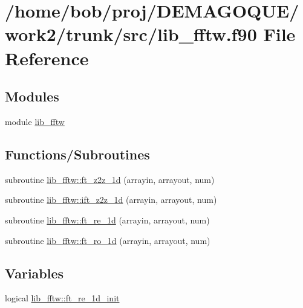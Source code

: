\hypertarget{lib__fftw_8f90}{
\section{/home/bob/proj/DEMAGOQUE/work2/trunk/src/lib\_\-fftw.f90 File Reference}
\label{lib__fftw_8f90}
}
\subsection*{Modules}
\begin{DoxyCompactItemize}
\item 
module \hyperlink{namespacelib__fftw}{lib\_\-fftw}
\end{DoxyCompactItemize}
\subsection*{Functions/Subroutines}
\begin{DoxyCompactItemize}
\item 
subroutine \hyperlink{namespacelib__fftw_aa8927337a6ab7389c514e6460179570c}{lib\_\-fftw::ft\_\-z2z\_\-1d} (arrayin, arrayout, num)
\item 
subroutine \hyperlink{namespacelib__fftw_a29b8b749b6fc05610271170ebcce73b0}{lib\_\-fftw::ift\_\-z2z\_\-1d} (arrayin, arrayout, num)
\item 
subroutine \hyperlink{namespacelib__fftw_a2149f71532d3cff627c4683eb96553dc}{lib\_\-fftw::ft\_\-re\_\-1d} (arrayin, arrayout, num)
\item 
subroutine \hyperlink{namespacelib__fftw_a65faa306b75bb0444df109807bad2046}{lib\_\-fftw::ft\_\-ro\_\-1d} (arrayin, arrayout, num)
\end{DoxyCompactItemize}
\subsection*{Variables}
\begin{DoxyCompactItemize}
\item 
logical \hyperlink{namespacelib__fftw_a0c5a949d6fae23ba1b961780d217469e}{lib\_\-fftw::ft\_\-re\_\-1d\_\-init}
\end{DoxyCompactItemize}
